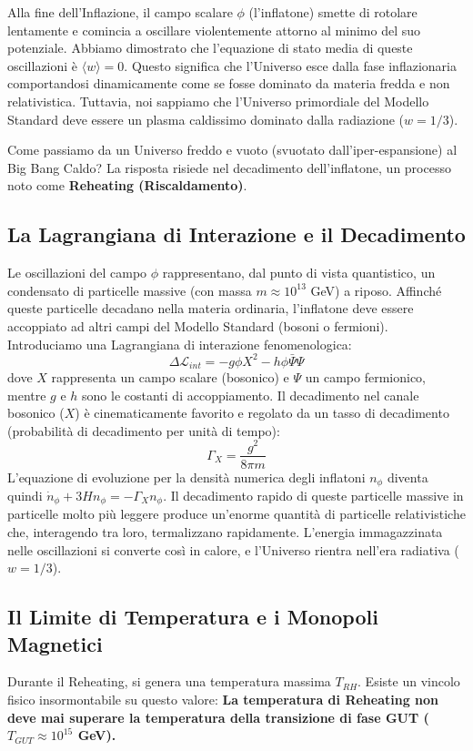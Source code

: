 \documentclass[11pt,a4paper]{report}
\begin{document}
Alla fine dell'Inflazione, il campo scalare $\phi$ (l'inflatone) smette di rotolare lentamente e comincia a oscillare violentemente attorno al minimo del suo potenziale. Abbiamo dimostrato che l'equazione di stato media di queste oscillazioni è $\langle w \rangle = 0$. 
Questo significa che l'Universo esce dalla fase inflazionaria comportandosi dinamicamente come se fosse dominato da materia fredda e non relativistica. Tuttavia, noi sappiamo che l'Universo primordiale del Modello Standard deve essere un plasma caldissimo dominato dalla radiazione ($w = 1/3$). 

Come passiamo da un Universo freddo e vuoto (svuotato dall'iper-espansione) al Big Bang Caldo? La risposta risiede nel decadimento dell'inflatone, un processo noto come \textbf{Reheating (Riscaldamento)}.

\subsection{La Lagrangiana di Interazione e il Decadimento}
Le oscillazioni del campo $\phi$ rappresentano, dal punto di vista quantistico, un condensato di particelle massive (con massa $m \approx 10^{13}$ GeV) a riposo. Affinché queste particelle decadano nella materia ordinaria, l'inflatone deve essere accoppiato ad altri campi del Modello Standard (bosoni o fermioni). 
Introduciamo una Lagrangiana di interazione fenomenologica:
\begin{equation}
\Delta \mathcal{L}_{int} = -g \phi X^2 - h \phi \bar{\Psi}\Psi
\end{equation}
dove $X$ rappresenta un campo scalare (bosonico) e $\Psi$ un campo fermionico, mentre $g$ e $h$ sono le costanti di accoppiamento.
Il decadimento nel canale bosonico ($X$) è cinematicamente favorito e regolato da un tasso di decadimento (probabilità di decadimento per unità di tempo):
\begin{equation}
\Gamma_X = \frac{g^2}{8\pi m}
\end{equation}
L'equazione di evoluzione per la densità numerica degli inflatoni $n_\phi$ diventa quindi $\dot{n}_\phi + 3Hn_\phi = -\Gamma_X n_\phi$. Il decadimento rapido di queste particelle massive in particelle molto più leggere produce un'enorme quantità di particelle relativistiche che, interagendo tra loro, termalizzano rapidamente. L'energia immagazzinata nelle oscillazioni si converte così in calore, e l'Universo rientra nell'era radiativa ($w=1/3$).

\subsection{Il Limite di Temperatura e i Monopoli Magnetici}
Durante il Reheating, si genera una temperatura massima $T_{RH}$. Esiste un vincolo fisico insormontabile su questo valore:
\textbf{La temperatura di Reheating non deve mai superare la temperatura della transizione di fase GUT ($T_{GUT} \approx 10^{15}$ GeV).}
\end{document}
